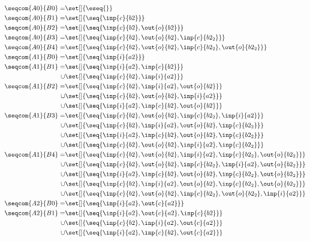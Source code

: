 \begin{align*}%
\seqcom{A0}{B0} = &\set[]{\eseq{}}\\
%
\seqcom{A0}{B1} = &\set[]{\seq{\inp{c}{b2}}}\\
%
\seqcom{A0}{B2} = &\set[]{\seq{\inp{c}{b2},\out{o}{b2}}}\\
%
\seqcom{A0}{B3} = &\set[]{\seq{\inp{c}{b2},\out{o}{b2},\inp{c}{b2_2}}}\\
%
\seqcom{A0}{B4} = &\set[]{\seq{\inp{c}{b2},\out{o}{b2},\inp{c}{b2_2},\out{o}{b2_2}}}\\
%
\seqcom{A1}{B0} = &\set[]{\seq{\inp{i}{a2}}}\\
%
\seqcom{A1}{B1} = &\set[]{\seq{\inp{i}{a2},\inp{c}{b2}}}\\
\cup&\set[]{\seq{\inp{c}{b2},\inp{i}{a2}}}\\
%
\seqcom{A1}{B2} = &\set[]{\seq{\inp{c}{b2},\inp{i}{a2},\out{o}{b2}}}\\
\cup&\set[]{\seq{\inp{c}{b2},\out{o}{b2},\inp{i}{a2}}}\\
\cup&\set[]{\seq{\inp{i}{a2},\inp{c}{b2},\out{o}{b2}}}\\
%
\seqcom{A1}{B3} = &\set[]{\seq{\inp{c}{b2},\out{o}{b2},\inp{c}{b2_2},\inp{i}{a2}}}\\
\cup&\set[]{\seq{\inp{c}{b2},\inp{i}{a2},\out{o}{b2},\inp{c}{b2_2}}}\\
\cup&\set[]{\seq{\inp{i}{a2},\inp{c}{b2},\out{o}{b2},\inp{c}{b2_2}}}\\
\cup&\set[]{\seq{\inp{c}{b2},\out{o}{b2},\inp{i}{a2},\inp{c}{b2_2}}}\\
%
\seqcom{A1}{B4} = &\set[]{\seq{\inp{c}{b2},\out{o}{b2},\inp{i}{a2},\inp{c}{b2_2},\out{o}{b2_2}}}\\
\cup&\set[]{\seq{\inp{c}{b2},\out{o}{b2},\inp{c}{b2_2},\inp{i}{a2},\out{o}{b2_2}}}\\
\cup&\set[]{\seq{\inp{i}{a2},\inp{c}{b2},\out{o}{b2},\inp{c}{b2_2},\out{o}{b2_2}}}\\
\cup&\set[]{\seq{\inp{c}{b2},\inp{i}{a2},\out{o}{b2},\inp{c}{b2_2},\out{o}{b2_2}}}\\
\cup&\set[]{\seq{\inp{c}{b2},\out{o}{b2},\inp{c}{b2_2},\out{o}{b2_2},\inp{i}{a2}}}\\
%
\seqcom{A2}{B0} = &\set[]{\seq{\inp{i}{a2},\out{c}{a2}}}\\
%
\seqcom{A2}{B1} = &\set[]{\seq{\inp{i}{a2},\out{c}{a2},\inp{c}{b2}}}\\
\cup&\set[]{\seq{\inp{c}{b2},\inp{i}{a2},\out{c}{a2}}}\\
\cup&\set[]{\seq{\inp{i}{a2},\inp{c}{b2},\out{c}{a2}}}\\

\end{align*}

